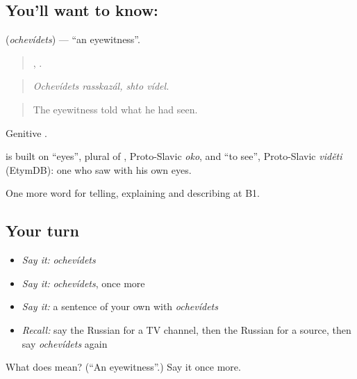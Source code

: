 \subsection*{You'll want to know: }
\textbf{} (\emph{ochevídets}) — \textquotedblleft{}an eyewitness\textquotedblright{}.

\begin{quote}
 ,  .
\end{quote}

\begin{quote}
\emph{Ochevídets rasskazál, shto vídel.}
\end{quote}

\begin{quote}
The eyewitness told what he had seen.
\end{quote}

Genitive \emph{}.

\begin{cousinweb}
\emph{} is built on \emph{} \textquotedblleft{}eyes\textquotedblright{}, plural of \emph{}, Proto-Slavic \emph{oko}, and \emph{} \textquotedblleft{}to see\textquotedblright{}, Proto-Slavic \emph{viděti} (EtymDB): one who saw with his own eyes.
\end{cousinweb}

\begin{grammarlens}[title={What you've built}]
One more word for telling, explaining and describing at B1.
\end{grammarlens}

\subsection*{Your turn}
\begin{itemize}
\raggedright
  \item \emph{Say it:} \emph{ochevídets}
  \item \emph{Say it:} \emph{ochevídets}, once more
  \item \emph{Say it:} a sentence of your own with \emph{ochevídets}
  \item \emph{Recall:} say the Russian for a TV channel, then the Russian for a source, then say \emph{ochevídets} again
\end{itemize}

\begin{tcolorbox}[breakable,colback=teal!4,colframe=teal!35!black,title={Before you move on}]
What does  mean? (\textquotedblleft{}An eyewitness\textquotedblright{}.) Say it once more.
\end{tcolorbox}
